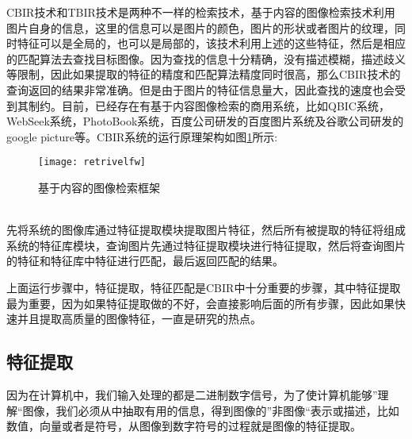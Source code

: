 CBIR技术和TBIR技术是两种不一样的检索技术，基于内容的图像检索技术利用图片自身的信息，这里的信息可以是图片的颜色，图片的形状或者图片的纹理，同时特征可以是全局的，也可以是局部的，该技术利用上述的这些特征，然后是相应的匹配算法去查找目标图像。因为查找的信息十分精确，没有描述模糊，描述歧义等限制，因此如果提取的特征的精度和匹配算法精度同时很高，那么CBIR技术的查询返回的结果非常准确。但是由于图片的特征信息量大，因此查找的速度也会受到其制约。目前，已经存在有基于内容图像检索的商用系统，比如QBIC系统，WebSeek系统，PhotoBook系统，百度公司研发的百度图片系统及谷歌公司研发的google picture等。CBIR系统的运行原理架构如图\ref{fig:CBIR_fw}所示:
\begin{figure}[htp]
\centering
\texttt{[image: retrivelfw]}
\caption{基于内容的图像检索框架}
\label{fig:CBIR_fw}
\end{figure}
\\先将系统的图像库通过特征提取模块提取图片特征，然后所有被提取的特征将组成系统的特征库模块，查询图片先通过特征提取模块进行特征提取，然后将查询图片的特征和特征库中特征进行匹配，最后返回匹配的结果。

上面运行步骤中，特征提取，特征匹配是CBIR中十分重要的步骤，其中特征提取最为重要，因为如果特征提取做的不好，会直接影响后面的所有步骤，因此如果快速并且提取高质量的图像特征，一直是研究的热点。

\subsection{特征提取}
因为在计算机中，我们输入处理的都是二进制数字信号，为了使计算机能够”理解“图像，我们必须从中抽取有用的信息，得到图像的”非图像“表示或描述，比如数值，向量或者是符号，从图像到数字符号的过程就是图像的特征提取。
